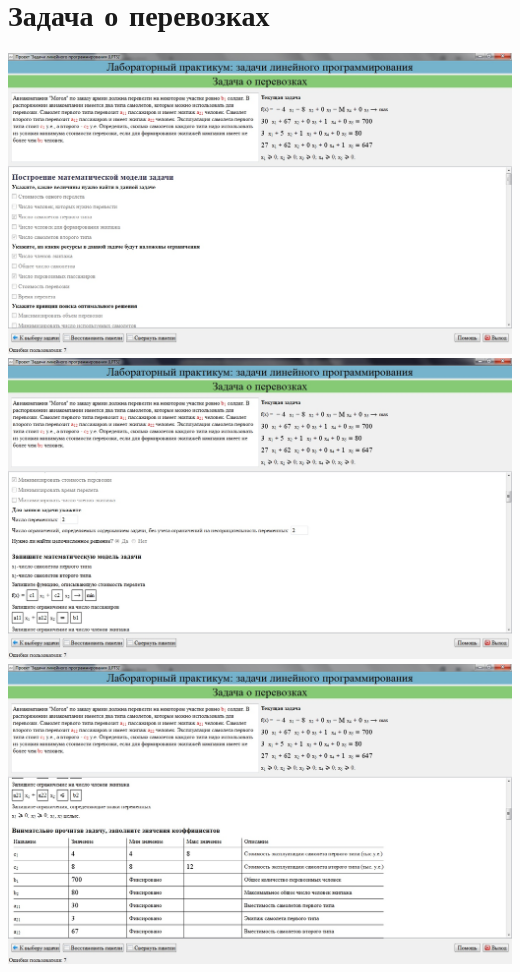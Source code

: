 \section{Задача о перевозках}

\includegraphics[width=\linewidth]{om_hw_02/images/1_1.jpg}\\
\includegraphics[width=\linewidth]{om_hw_02/images/1_2.jpg}\\
\includegraphics[width=\linewidth]{om_hw_02/images/1_3.jpg}\\
